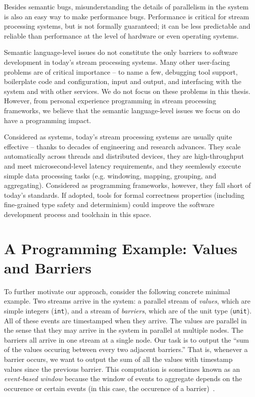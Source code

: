Besides semantic bugs, misunderstanding the details of parallelism in the system is also an easy way to make performance bugs. Performance is critical for stream processing systems, but is not formally guaranteed; it can be less predictable and reliable than performance at the level of hardware or even operating systems.

Semantic language-level issues do not constitute the only barriers to software development in today's stream processing systems. Many other user-facing problems are of critical importance -- to name a few, debugging tool support, boilerplate code and configuration, input and output, and interfacing with the system and with other services. We do not focus on these problems in this thesis. However, from personal experience programming in stream processing frameworks, we believe that the semantic language-level issues we focus on do have a programming impact.

Considered as systems, today's stream processing systems are usually quite effective -- thanks to decades of engineering and research advances. They scale automatically across threads and distributed devices, they are high-throughput and meet microsecond-level latency requirements, and they seemlessly execute simple data processing tasks (e.g. windowing, mapping, grouping, and aggregating). Considered as programming frameworks, however, they fall short of today's standards. If adopted, tools for formal correctness properties (including fine-grained type safety and determinism) could improve the software development process and toolchain in this space.

\section{A Programming Example: Values and Barriers}
\label{ex:value-barrier}

To further motivate our approach, consider the following concrete minimal example.
Two streams arrive in the system: a parallel stream of \emph{values}, which are simple integers (\texttt{int}), and a stream of \emph{barriers}, which are of the unit type (\texttt{unit}).
All of these events are timestamped when they arrive.
The values are parallel in the sense that they may arrive in the system in parallel at multiple nodes.
The barriers all arrive in one stream at a single node.
Our task is to output the ``sum of the values occuring between every two adjacent barriers.'' That is, whenever a barrier occurs, we want to output the sum of all the values with timestamp values since the previous barrier. This computation is sometimes known as an \emph{event-based window} because the window of events to aggregate depends on the occurence or certain events (in this case, the occurence of a barrier)~\cite{EventBasedWindow}.

